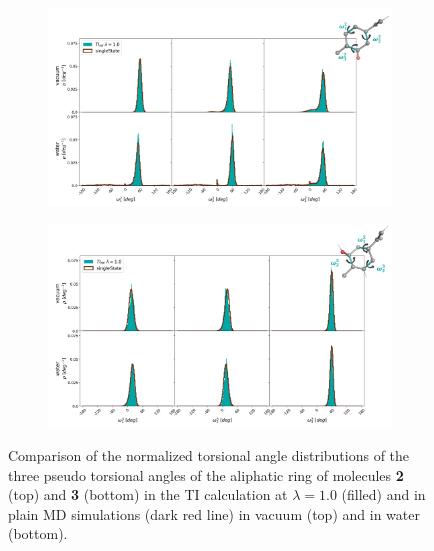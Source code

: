 \begin{figure}[h!]
    \centering
    \begin{subfigure}{0.85\columnwidth}
        \includegraphics[width=\textwidth]{fig/results/pairwise/sampling/torsions/TI_O70_rtorsion_ana_partnerM030_singleState_populations_total.png}
        \end{subfigure}
    \begin{subfigure}{0.85\columnwidth}
        \includegraphics[width=\textwidth]{fig/results/pairwise/sampling/torsions/TI_O71_rtorsion_ana_partnerM030_singleState_populations_total.png}
        \end{subfigure}
    \caption{Comparison of the normalized torsional angle distributions of the three pseudo torsional angles of the aliphatic ring of molecules \textbf{2} (top) and \textbf{3} (bottom) in the TI calculation at $\lambda=1.0$ (filled) and in plain MD simulations (dark red line) in vacuum (top) and in water (bottom).}
    \label{fig: TIringTorisions}
\end{figure}


